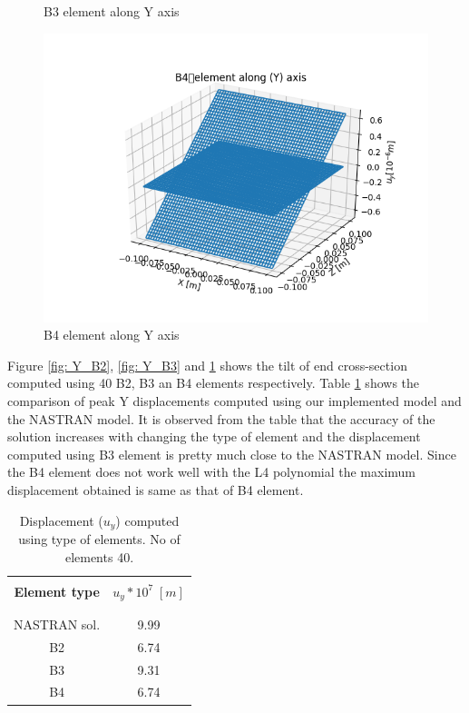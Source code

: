 \documentclass[a4paper,12pt]{article}
\begin{document}
\begin{figure}[!htbp]
\begin{minipage}[b]{0.45\textwidth}
    \caption{B3 element along Y axis}
    \label{fig: Y_B3}
  \end{minipage}
  \hfill
  \begin{minipage}[b]{0.45\textwidth}
    \includegraphics[width=\textwidth]{17.png}
    \caption{B4 element along Y axis}
    \label{fig: Y_B4}
  \end{minipage}
\end{figure}

Figure \ref{fig: Y_B2}, \ref{fig: Y_B3} and \ref{fig: Y_B4} shows the tilt of end cross-section computed using 40 B2, B3 an B4 elements respectively. Table \ref{tab:table 8}  shows the comparison of peak Y displacements computed using our implemented model and the NASTRAN model. It is observed from the table that the accuracy of the solution increases with changing the type of element and the displacement computed using B3 element is pretty much close to the NASTRAN model. Since the B4 element does not work well with the L4 polynomial the maximum displacement obtained is same as that of B4 element.
\newpage
\begin{table}[h!]
  \begin{center}
     \begin{tabular}{c c}
      \hline\\
      \textbf{Element type} & \textbf{$u_{y}*10^{7}\;[m]$} \\
      \\
      \hline
      \\[-2pt]
       NASTRAN sol. & 9.99 \\[5pt]
       B2 & 6.74\\[5pt]
       B3 & 9.31 \\[5pt]
       B4 & 6.74 \\[5pt]

      \hline
     \end{tabular}
    \caption{Displacement ($u_{y}$) computed  using type of elements. No of elements 40.}
    \label{tab:table 8}
  \end{center}
\end{table}
\end{document}
